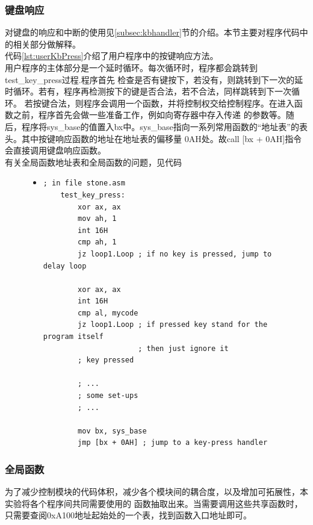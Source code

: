 \documentclass[a4paper]{article}
\newcommand{\codev}[1]{\textsf{#1}}
\begin{document}
    \subsubsection{键盘响应}
    对键盘的响应和中断的使用见\ref{subsec:kbhandler}节的介绍。本节主要对程序代码中的相关部分做解释。\\

    代码\ref{lst:userKbPress}介绍了用户程序中的按键响应方法。\\
    
    用户程序的主体部分是一个延时循环。每次循环时，程序都会跳转到test\_key\_press过程.程序首先
    检查是否有键按下，若没有，则跳转到下一次的延时循环。若有，程序再检测按下的键是否合法，若不合法，同样跳转到下一次循环。
    若按键合法，则程序会调用一个函数，并将控制权交给控制程序。在进入函数之前，程序首先会做一些准备工作，例如向寄存器中存入传递
    的参数等。随后，程序将sys\_base的值置入bx中。sys\_base指向一系列常用函数的``地址表''的表头。其中按键响应函数的地址在地址表的偏移量
    0AH处。故\codev{call [bx + 0AH]}指令会直接调用键盘响应函数。 \\
     
    有关全局函数地址表和全局函数的问题，见代码%
    
    \begin{figure}
    \begin{itemize}
    \item[] \begin{lstlisting}[language={[x86masm]Assembler}, label=lst:userKbPress, caption=用户程序中对键盘按下的响应]
    ; in file stone.asm
    test_key_press:
        xor ax, ax
        mov ah, 1
        int 16H
        cmp ah, 1
        jz loop1.Loop ; if no key is pressed, jump to delay loop

        xor ax, ax
        int 16H
        cmp al, mycode
        jz loop1.Loop ; if pressed key stand for the program itself
                      ; then just ignore it
        ; key pressed

        ; ...
        ; some set-ups
        ; ...

        mov bx, sys_base
        jmp [bx + 0AH] ; jump to a key-press handler
    \end{lstlisting}
    \end{itemize}
    \end{figure}

    \subsubsection{全局函数}
    为了减少控制模块的代码体积，减少各个模块间的耦合度，以及增加可拓展性，本实验将各个程序间共同需要使用的
    函数抽取出来。当需要调用这些共享函数时，只需要查阅0xA100地址起始处的一个表，找到函数入口地址即可。\\ 
\end{document}
